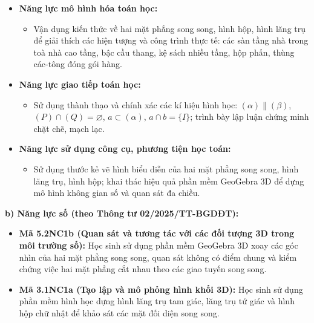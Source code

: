 \documentclass[12pt, a4paper]{article}
\begin{document}
\begin{itemize}[leftmargin=1.5em]
\begin{itemize}
        \item Vận dụng các định lí giao tuyến và định lí Thalès trong không gian để xác định thiết diện, tính tỉ số đoạn thẳng và giải quyết các bài toán hình học tổng hợp.
    \end{itemize}
    \item \textbf{Năng lực mô hình hóa toán học:}
    \begin{itemize}
        \item Vận dụng kiến thức về hai mặt phẳng song song, hình hộp, hình lăng trụ để giải thích các hiện tượng và công trình thực tế: các sàn tầng nhà trong toà nhà cao tầng, bậc cầu thang, kệ sách nhiều tầng, hộp phấn, thùng các-tông đóng gói hàng.
    \end{itemize}
    \item \textbf{Năng lực giao tiếp toán học:}
    \begin{itemize}
        \item Sử dụng thành thạo và chính xác các kí hiệu hình học: $(\alpha) \parallel (\beta)$, $(P) \cap (Q) = \varnothing$, $a \subset (\alpha)$, $a \cap b = \{I\}$; trình bày lập luận chứng minh chặt chẽ, mạch lạc.
    \end{itemize}
    \item \textbf{Năng lực sử dụng công cụ, phương tiện học toán:}
    \begin{itemize}
        \item Sử dụng thước kẻ vẽ hình biểu diễn của hai mặt phẳng song song, hình lăng trụ, hình hộp; khai thác hiệu quả phần mềm GeoGebra 3D để dựng mô hình không gian số và quan sát đa chiều.
    \end{itemize}
\end{itemize}

\textbf{b) Năng lực số (theo Thông tư 02/2025/TT-BGDĐT):}
\begin{itemize}[leftmargin=1.5em]
    \item \textbf{Mã 5.2NC1b (Quan sát và tương tác với các đối tượng 3D trong môi trường số):} Học sinh sử dụng phần mềm GeoGebra 3D xoay các góc nhìn của hai mặt phẳng song song, quan sát không có điểm chung và kiểm chứng việc hai mặt phẳng cắt nhau theo các giao tuyến song song.
    \item \textbf{Mã 3.1NC1a (Tạo lập và mô phỏng hình khối 3D):} Học sinh sử dụng phần mềm hình học dựng hình lăng trụ tam giác, lăng trụ tứ giác và hình hộp chữ nhật để khảo sát các mặt đối diện song song.
\end{itemize}
\end{document}
